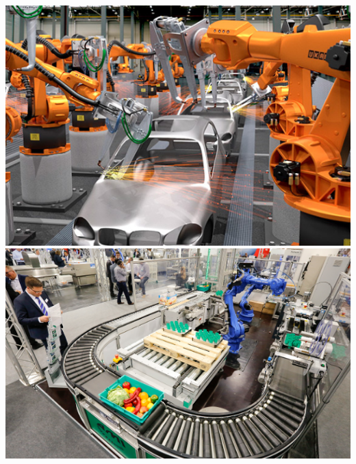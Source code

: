 \documentclass[12pt,a4paper]{article}
\begin{document}
\begin{center}
\includegraphics[scale=1.28]{4.PNG}
\includegraphics[scale=1.23]{7.PNG}
\end{center}
\end{document}

